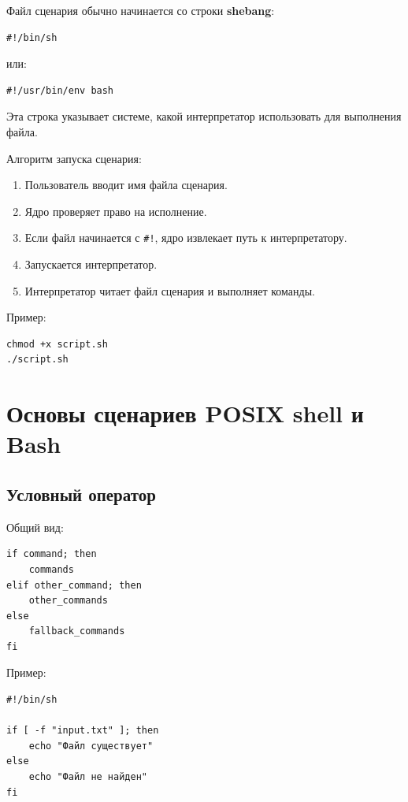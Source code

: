 \documentclass[12pt,a4paper]{article}
\begin{document}
Файл сценария обычно начинается со строки \textbf{shebang}:

\begin{lstlisting}
#!/bin/sh
\end{lstlisting}

или:

\begin{lstlisting}
#!/usr/bin/env bash
\end{lstlisting}

Эта строка указывает системе, какой интерпретатор использовать для выполнения файла.

Алгоритм запуска сценария:
\begin{enumerate}
    \item Пользователь вводит имя файла сценария.
    \item Ядро проверяет право на исполнение.
    \item Если файл начинается с \texttt{\#!}, ядро извлекает путь к интерпретатору.
    \item Запускается интерпретатор.
    \item Интерпретатор читает файл сценария и выполняет команды.
\end{enumerate}

Пример:

\begin{lstlisting}
chmod +x script.sh
./script.sh
\end{lstlisting}

\section{Основы сценариев POSIX shell и Bash}

\subsection{Условный оператор}

Общий вид:

\begin{lstlisting}
if command; then
    commands
elif other_command; then
    other_commands
else
    fallback_commands
fi
\end{lstlisting}

Пример:

\begin{lstlisting}
#!/bin/sh

if [ -f "input.txt" ]; then
    echo "Файл существует"
else
    echo "Файл не найден"
fi
\end{lstlisting}
\end{document}
